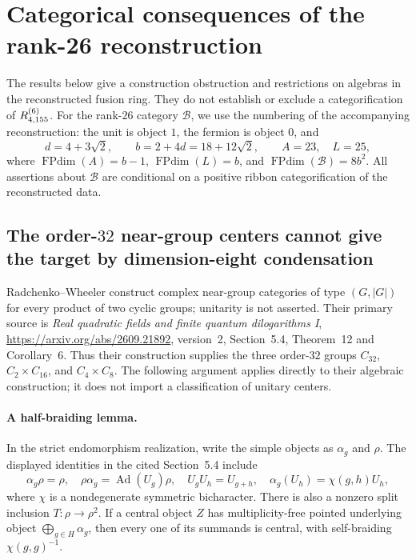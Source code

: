 \section{Categorical consequences of the rank-26 reconstruction}
\label{sec:r155-new-categorical}

The results below give a construction obstruction and restrictions on
algebras in the reconstructed fusion ring. They do not establish or
exclude a categorification of $R^{(6)}_{4,155}$. For the rank-$26$ category
$\mathcal B$, we use the numbering of the accompanying reconstruction:
the unit is object $1$, the fermion is object $0$, and
\[
 d=4+3\sqrt2,\qquad b=2+4d=18+12\sqrt2,\qquad
 A=23,\quad L=25,
\]
where $\operatorname{FPdim}(A)=b-1$, $\operatorname{FPdim}(L)=b$, and
$\operatorname{FPdim}(\mathcal B)=8b^2$. All assertions about
$\mathcal B$ are conditional on a positive ribbon categorification of
the reconstructed data.

\subsection{The order-$32$ near-group centers cannot give the target
by dimension-eight condensation}

Radchenko--Wheeler construct complex near-group categories of type
$(G,|G|)$ for every product of two cyclic groups; unitarity is not
asserted. Their primary source is
\emph{Real quadratic fields and finite quantum dilogarithms I},
\url{https://arxiv.org/abs/2609.21892}, version~2, Section~5.4,
Theorem~12 and Corollary~6. Thus their construction supplies the three
order-$32$ groups $C_{32}$, $C_2\times C_{16}$, and $C_4\times C_8$.
The following argument applies directly to their algebraic construction;
it does not import a classification of unitary centers.

\paragraph{A half-braiding lemma.}
In the strict endomorphism realization, write the simple objects as
$\alpha_g$ and $\rho$. The displayed identities in the cited Section~5.4
include
\[
 \alpha_g\rho=\rho,\quad
 \rho\alpha_g=\operatorname{Ad}(U_g)\rho,\quad
 U_gU_h=U_{g+h},\quad
 \alpha_g(U_h)=\chi(g,h)U_h,
\]
where $\chi$ is a nondegenerate symmetric bicharacter. There is also a
nonzero split inclusion $T:\rho\longrightarrow\rho^2$.
If a central object $Z$ has multiplicity-free pointed underlying object
$\bigoplus_{g\in H}\alpha_g$, then every one of its summands is central,
with self-braiding $\chi(g,g)^{-1}$.

